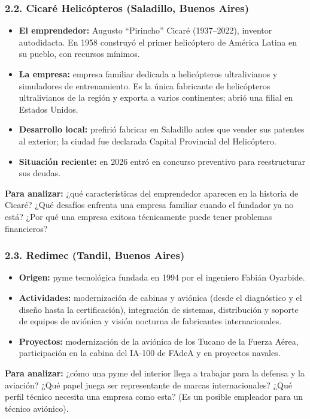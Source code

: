 \subsubsection*{2.2. Cicaré Helicópteros (Saladillo, Buenos Aires)}
\begin{itemize}
  \item \textbf{El emprendedor:} Augusto ``Pirincho'' Cicaré (1937--2022), inventor
        autodidacta. En 1958 construyó el primer helicóptero de América Latina en su pueblo,
        con recursos mínimos.
  \item \textbf{La empresa:} empresa familiar dedicada a helicópteros ultralivianos y
        simuladores de entrenamiento. Es la única fabricante de helicópteros ultralivianos de
        la región y exporta a varios continentes; abrió una filial en Estados Unidos.
  \item \textbf{Desarrollo local:} prefirió fabricar en Saladillo antes que vender sus
        patentes al exterior; la ciudad fue declarada Capital Provincial del Helicóptero.
  \item \textbf{Situación reciente:} en 2026 entró en concurso preventivo para reestructurar
        sus deudas.
\end{itemize}
\textbf{Para analizar:} ¿qué características del emprendedor aparecen en la historia de
Cicaré? ¿Qué desafíos enfrenta una empresa familiar cuando el fundador ya no está? ¿Por qué
una empresa exitosa técnicamente puede tener problemas financieros?

\subsubsection*{2.3. Redimec (Tandil, Buenos Aires)}
\begin{itemize}
  \item \textbf{Origen:} pyme tecnológica fundada en 1994 por el ingeniero Fabián Oyarbide.
  \item \textbf{Actividades:} modernización de cabinas y aviónica (desde el diagnóstico y el
        diseño hasta la certificación), integración de sistemas, distribución y soporte de
        equipos de aviónica y visión nocturna de fabricantes internacionales.
  \item \textbf{Proyectos:} modernización de la aviónica de los Tucano de la Fuerza Aérea,
        participación en la cabina del IA-100 de FAdeA y en proyectos navales.
\end{itemize}
\textbf{Para analizar:} ¿cómo una pyme del interior llega a trabajar para la defensa y la
aviación? ¿Qué papel juega ser representante de marcas internacionales? ¿Qué perfil técnico
necesita una empresa como esta? (Es un posible empleador para un técnico aviónico).

